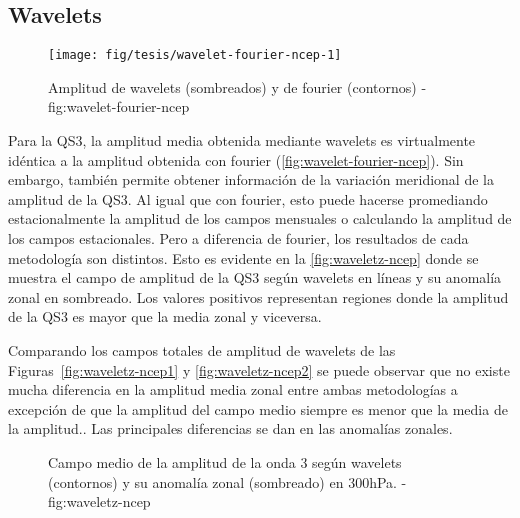 \documentclass[spanish,a4paper]{book}
\begin{document}

\subsection{Wavelets}\label{wavelets}

\begin{figure}

{\centering \texttt{[image: fig/tesis/wavelet-fourier-ncep-1]} 

}

\caption{Amplitud de wavelets (sombreados) y de fourier (contornos) - fig:wavelet-fourier-ncep}\label{fig:wavelet-fourier-ncep}
\end{figure}

Para la QS3, la amplitud media obtenida mediante wavelets
 es virtualmente idéntica a la
amplitud obtenida con fourier (\autoref{fig:wavelet-fourier-ncep}). Sin
embargo, también permite obtener información de la variación meridional
de la amplitud de la QS3. Al igual que con fourier, esto puede hacerse
promediando estacionalmente la amplitud de los campos mensuales o
calculando la amplitud de los campos estacionales. Pero a diferencia de
fourier, los resultados de cada metodología son distintos. Esto es
evidente en la \autoref{fig:waveletz-ncep} donde se muestra el campo de
amplitud de la QS3 según wavelets en líneas y su anomalía zonal en
sombreado. Los valores positivos representan regiones donde la amplitud
de la QS3 es mayor que la media zonal y viceversa.

Comparando los campos totales de amplitud de wavelets de las
Figuras~\ref{fig:waveletz-ncep1} y \ref{fig:waveletz-ncep2} se puede
observar que no existe mucha diferencia en la amplitud media zonal entre
ambas metodologías a excepción de que la amplitud del campo medio
siempre es menor que la media de la
amplitud..
Las principales diferencias se dan en las anomalías zonales.

\begin{figure*}
\newline{}\caption{Campo medio de la amplitud de la onda 3 según wavelets (contornos) y su anomalía zonal (sombreado) en 300hPa. - fig:waveletz-ncep}\label{fig:waveletz-ncep}
\end{figure*}
\end{document}
